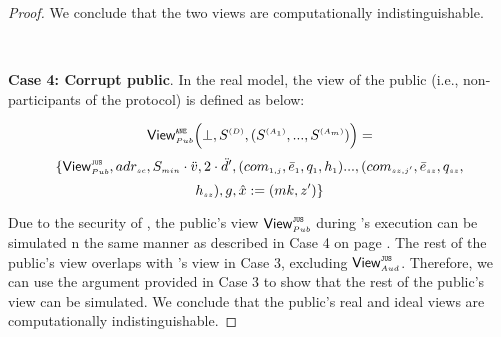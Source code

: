 \begin{proof}
We conclude that the two views are computationally indistinguishable.


 
 \

\noindent\textbf{Case 4: Corrupt public}. In the real model, the view of the public (i.e., non-participants of the protocol) is defined as below: 
 

 $$ \mathsf{View}_{\scriptscriptstyle Pub}^{\scriptscriptstyle \mathtt{ANE}} \Big(\bot, S^{\scriptscriptstyle (D)},(S^{\scriptscriptstyle (A_1)},..., S^{\scriptscriptstyle (A_m)})\Big)=$$ $$ 
\{\mathsf{View}^{\scriptscriptstyle \mathtt{JUS}}_{\scriptscriptstyle Pub}, adr_{\scriptscriptstyle sc}, S_{\scriptscriptstyle min}\cdot \ddot{v}, 2\cdot \ddot{d}', (com_{\scriptscriptstyle 1,j}, \bar{e}_{\scriptscriptstyle 1}, q_{\scriptscriptstyle 1}, h_{\scriptscriptstyle 1})..., (com_{\scriptscriptstyle sz, j'}, \bar{e}_{\scriptscriptstyle sz}, q_{\scriptscriptstyle {sz}}, $$ $$h_{\scriptscriptstyle sz}), g, \hat{x}:=({mk}, z')\}$$
 
 
 
  Due to the security of \fpsi, the public's view $\mathsf{View}^{\scriptscriptstyle \mathtt{JUS}}_{\scriptscriptstyle Pub}$ during \fpsi's execution can be simulated n the same manner as described in Case 4 on page \pageref{sec::F-PSI-proof}. The rest of the public's view overlaps with \aud's view in Case 3, excluding $\mathsf{View}^{\scriptscriptstyle \mathtt{JUS}}_{\scriptscriptstyle Aud}$. Therefore, we can use the argument provided in Case 3 to show that the rest of the public's view can be simulated.     
   We  conclude that the public's real and ideal views are computationally indistinguishable. 
\end{proof}















